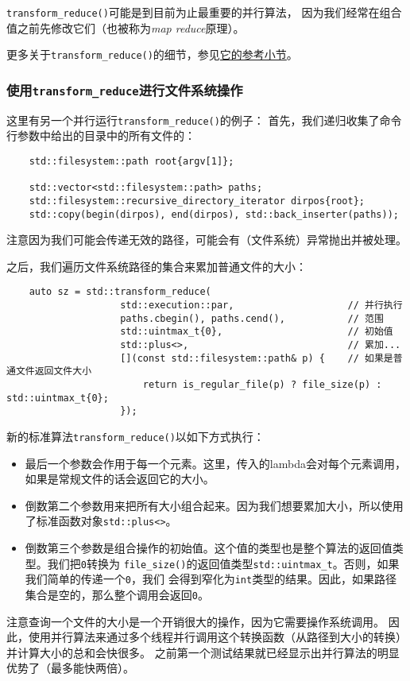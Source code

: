 \texttt{transform\_reduce()}可能是到目前为止最重要的并行算法，
因为我们经常在组合值之前先修改它们（也被称为\emph{map reduce}原理）。

更多关于\texttt{transform\_reduce()}的细节，参见\hyperref[ch23.2.2]{它的参考小节}。

\subsubsection{使用\texttt{transform\_reduce}进行文件系统操作}\label{ch22.6.1.4}
这里有另一个并行运行\texttt{transform\_reduce()}的例子：
首先，我们递归收集了命令行参数中给出的目录中的所有文件的：
\begin{lstlisting}
    std::filesystem::path root{argv[1]};

    std::vector<std::filesystem::path> paths;
    std::filesystem::recursive_directory_iterator dirpos{root};
    std::copy(begin(dirpos), end(dirpos), std::back_inserter(paths));
\end{lstlisting}
注意因为我们可能会传递无效的路径，可能会有（文件系统）异常抛出并被处理。

之后，我们遍历文件系统路径的集合来累加普通文件的大小：
\begin{lstlisting}
    auto sz = std::transform_reduce(
                    std::execution::par,                    // 并行执行
                    paths.cbegin(), paths.cend(),           // 范围
                    std::uintmax_t{0},                      // 初始值
                    std::plus<>,                            // 累加...
                    [](const std::filesystem::path& p) {    // 如果是普通文件返回文件大小
                        return is_regular_file(p) ? file_size(p) : std::uintmax_t{0};
                    });
\end{lstlisting}
新的标准算法\texttt{transform\_reduce()}以如下方式执行：
\begin{itemize}
    \item 最后一个参数会作用于每一个元素。这里，传入的lambda会对每个元素调用，
    如果是常规文件的话会返回它的大小。
    \item 倒数第二个参数用来把所有大小组合起来。因为我们想要累加大小，所以使用了标准函数对象\texttt{std::plus<>}。
    \item 倒数第三个参数是组合操作的初始值。这个值的类型也是整个算法的返回值类型。我们把\texttt{0}转换为
    \texttt{file\_size()}的返回值类型\texttt{std::uintmax\_t}。否则，如果我们简单的传递一个\texttt{0}，我们
    会得到窄化为\texttt{int}类型的结果。因此，如果路径集合是空的，那么整个调用会返回\texttt{0}。
\end{itemize}
注意查询一个文件的大小是一个开销很大的操作，因为它需要操作系统调用。
因此，使用并行算法来通过多个线程并行调用这个转换函数（从路径到大小的转换）并计算大小的总和会快很多。
之前第一个测试结果就已经显示出并行算法的明显优势了（最多能快两倍）。

